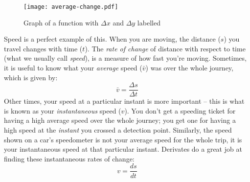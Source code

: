 \documentclass[../main.tex]{subfiles}
\begin{document}
\begin{figure}[h]
    \centering
    \texttt{[image: average-change.pdf]}
    \caption{Graph of a function with $\Delta x$ and $\Delta y$ labelled}
    \label{fig:average-change}
\end{figure}

Speed is a perfect example of this. When you are moving, the distance ($s$) 
you travel changes with time ($t$). The \emph{rate of change} of distance 
with respect to time (what we usually call \emph{speed}), 
is a measure of how fast you’re moving. Sometimes, it is useful to know 
what your \emph{average} speed ($\bar{v}$) was over the whole journey, 
which is given by:
\begin{equation*}
    \bar{v} = \frac{\Delta s}{\Delta t}
\end{equation*}
Other times, your speed at a particular instant is more important – 
this is what is known as your \emph{instantaneous} speed ($v$). 
You don’t get a speeding ticket for having a high average speed 
over the whole journey; you get one for having a high speed 
at the \emph{instant} you crossed a detection point. 
Similarly, the speed shown on a car’s speedometer is not your 
average speed for the whole trip, it is your instantaneous speed 
at that particular instant. Derivates do a great job at finding these 
instantaneous rates of change:
\begin{equation*}
    v = \frac{ds}{dt}
\end{equation*}
\end{document}
